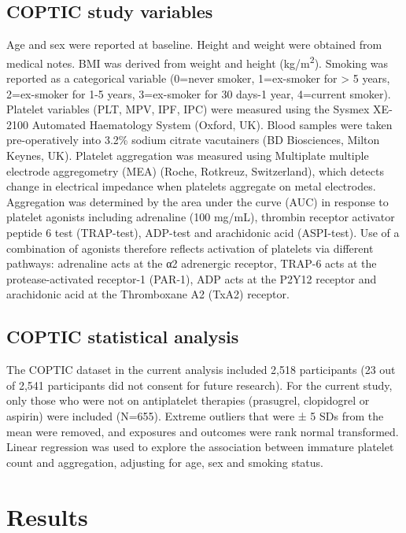 \documentclass[11pt,twoside]{bristolthesis}
\begin{document}
\hypertarget{coptic-study-variables}{%
\subsection{COPTIC study variables}\label{coptic-study-variables}}

Age and sex were reported at baseline. Height and weight were obtained from medical notes. BMI was derived from weight and height (kg/m\textsuperscript{2}). Smoking was reported as a categorical variable (0=never smoker, 1=ex-smoker for \textgreater{} 5 years, 2=ex-smoker for 1-5 years, 3=ex-smoker for 30 days-1 year, 4=current smoker). Platelet variables (PLT, MPV, IPF, IPC) were measured using the Sysmex XE-2100 Automated Haematology System (Oxford, UK). Blood samples were taken pre-operatively into 3.2\% sodium citrate vacutainers (BD Biosciences, Milton Keynes, UK). Platelet aggregation was measured using Multiplate multiple electrode aggregometry (MEA) (Roche, Rotkreuz, Switzerland), which detects change in electrical impedance when platelets aggregate on metal electrodes. Aggregation was determined by the area under the curve (AUC) in response to platelet agonists including adrenaline (100 mg/mL), thrombin receptor activator peptide 6 test (TRAP-test), ADP-test and arachidonic acid (ASPI-test). Use of a combination of agonists therefore reflects activation of platelets via different pathways: adrenaline acts at the α2 adrenergic receptor, TRAP-6 acts at the protease-activated receptor-1 (PAR-1), ADP acts at the P2Y12 receptor and arachidonic acid at the Thromboxane A2 (TxA2) receptor.

\hypertarget{coptic-statistical-analysis}{%
\subsection{COPTIC statistical analysis}\label{coptic-statistical-analysis}}

The COPTIC dataset in the current analysis included 2,518 participants (23 out of 2,541 participants did not consent for future research). For the current study, only those who were not on antiplatelet therapies (prasugrel, clopidogrel or aspirin) were included (N=655). Extreme outliers that were ± 5 SDs from the mean were removed, and exposures and outcomes were rank normal transformed. Linear regression was used to explore the association between immature platelet count and aggregation, adjusting for age, sex and smoking status.

\hypertarget{results}{%
\section{Results}\label{results}}
\end{document}

